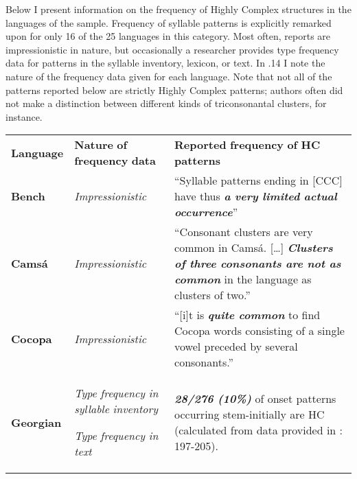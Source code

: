   Below I present information on the frequency of Highly Complex structures in the languages of the sample. Frequency of syllable patterns is explicitly remarked upon for only 16 of the 25 languages in this category. Most often, reports are impressionistic in nature, but occasionally a researcher provides type frequency data for patterns in the syllable inventory, lexicon, or text. In .14 I note the nature of the frequency data given for each language. Note that not all of the patterns reported below are strictly Highly Complex patterns; authors often did not make a distinction between different kinds of triconsonantal clusters, for instance.

\begin{table}
\begin{tabularx}{\textwidth}{XXX}
\lsptoprule

\textbf{Language} & \textbf{Nature} \textbf{of} \textbf{frequency} \textbf{data} & \textbf{Reported} \textbf{frequency} \textbf{of} \textbf{HC} \textbf{patterns}\\
{\bfseries Bench} & \textit{Impressionistic} & “Syllable patterns ending in [CCC] have thus \textbf{\textit{a} \textit{very} \textit{limited} \textit{actual} \textit{occurrence}}” \citep[92]{Rapold2006}\\
{\bfseries Camsá} & \textit{Impressionistic} & “Consonant clusters are very common in Camsá.\textbf{ }[…] \textbf{\textit{Clusters} \textit{of} \textit{three} \textit{consonants} \textit{are} \textit{not} \textit{as} \textit{common} }in the language as clusters of two.” \citep[81-4]{Howard1967}\\
\textbf{Cocopa} & \textit{Impressionistic} & “[i]t is \textbf{\textit{quite} \textit{common}} to find Cocopa words consisting of a single vowel preceded by several consonants.” \citep[1]{Bendixen1980}\\
\textbf{Georgian} & \textit{Type} \textit{frequency} \textit{in} \textit{syllable} \textit{inventory}

\textit{Type} \textit{frequency} \textit{in} \textit{text} & \textbf{\textit{28/276} \textit{(10\%)} }of onset patterns occurring stem-initially are HC (calculated from data provided in \citealt{Butskhrikidze2002}: 197-205).


\end{tabularx}
\end{table}
